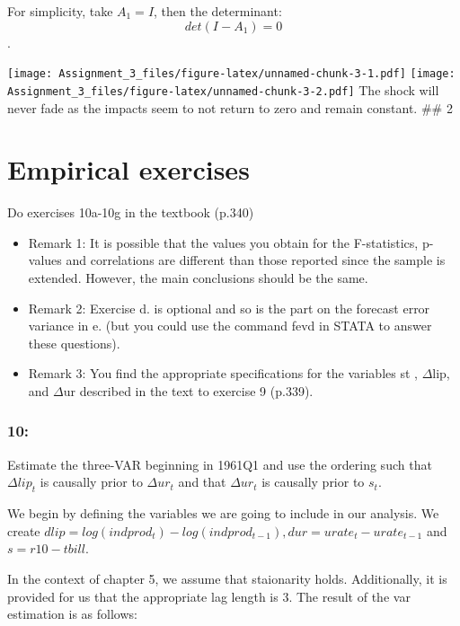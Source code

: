 \documentclass[]{article}
\begin{document}
For simplicity, take \(A_1 = I\), then the determinant:
\[ det(I-A_1) = 0\].

\texttt{[image: Assignment\_3\_files/figure-latex/unnamed-chunk-3-1.pdf]}
\texttt{[image: Assignment\_3\_files/figure-latex/unnamed-chunk-3-2.pdf]}
The shock will never fade as the impacts seem to not return to zero and
remain constant. \#\# 2

\section{Empirical exercises}\label{empirical-exercises}

Do exercises 10a-10g in the textbook (p.340)

\begin{itemize}
\item
  Remark 1: It is possible that the values you obtain for the
  F-statistics, p-values and correlations are different than those
  reported since the sample is extended. However, the main conclusions
  should be the same.
\item
  Remark 2: Exercise d. is optional and so is the part on the forecast
  error variance in e. (but you could use the command fevd in STATA to
  answer these questions).
\item
  Remark 3: You find the appropriate specifications for the variables st
  , \(\Delta\)lip, and \(\Delta\)ur described in the text to exercise 9
  (p.339).
\end{itemize}

\subsubsection{10:}\label{section-1}

Estimate the three-VAR beginning in 1961Q1 and use the ordering such
that \(\Delta lip_t\) is causally prior to \(\Delta ur_t\) and that
\(\Delta ur_t\) is causally prior to \(s_t\).

We begin by defining the variables we are going to include in our
analysis. We create
\(dlip = log(indprod_t) - log(indprod_{t-1}), dur = urate_t - urate_{t-1}\)
and \(s = r10 - tbill\).

In the context of chapter 5, we assume that staionarity holds.
Additionally, it is provided for us that the appropriate lag length is
3. The result of the var estimation is as follows:
\end{document}
